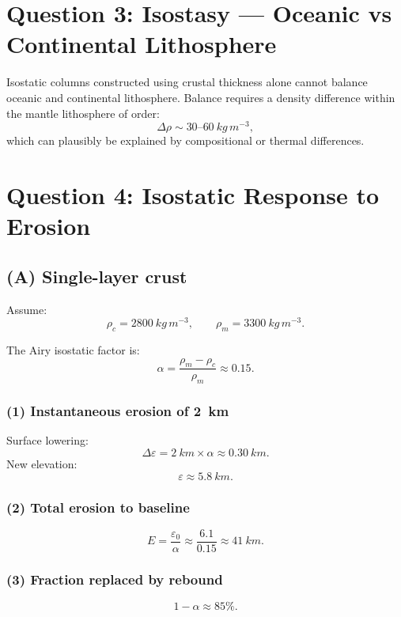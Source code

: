 \documentclass[11pt,a4paper]{article}
\begin{document}
\section*{Question 3: Isostasy --- Oceanic vs Continental Lithosphere}

Isostatic columns constructed using crustal thickness alone cannot balance oceanic
and continental lithosphere. Balance requires a density difference within the mantle
lithosphere of order:
\[
\Delta\rho \sim 30\text{--}60~\si{kg\,m^{-3}},
\]
which can plausibly be explained by compositional or thermal differences.

\section*{Question 4: Isostatic Response to Erosion}

\subsection*{(A) Single-layer crust}

Assume:
\[
\rho_c = 2800~\si{kg\,m^{-3}}, \qquad \rho_m = 3300~\si{kg\,m^{-3}}.
\]

The Airy isostatic factor is:
\[
\alpha = \frac{\rho_m - \rho_c}{\rho_m} \approx 0.15.
\]

\subsubsection*{(1) Instantaneous erosion of \SI{2}{km}}

Surface lowering:
\[
\Delta \varepsilon = 2~\si{km} \times \alpha \approx 0.30~\si{km}.
\]
New elevation:
\[
\varepsilon \approx \SI{5.8}{km}.
\]

\subsubsection*{(2) Total erosion to baseline}

\[
E = \frac{\varepsilon_0}{\alpha} \approx \frac{6.1}{0.15} \approx \SI{41}{km}.
\]

\subsubsection*{(3) Fraction replaced by rebound}

\[
1-\alpha \approx 85\%.
\]
\end{document}

